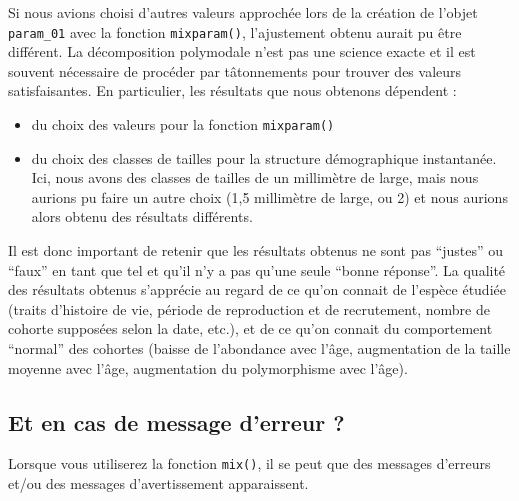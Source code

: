 \documentclass[
  a4paper,
  DIV=11,
  numbers=noendperiod,
  oneside]{scrreprt}
\providecommand{\tightlist}{%
  \setlength{\itemsep}{0pt}\setlength{\parskip}{0pt}}\usepackage{longtable,booktabs,array}
\begin{document}
\begin{tcolorbox}[enhanced jigsaw, colbacktitle=quarto-callout-important-color!10!white, opacityback=0, titlerule=0mm, leftrule=.75mm, bottomtitle=1mm, colframe=quarto-callout-important-color-frame, title=\textcolor{quarto-callout-important-color}{\faExclamation}\hspace{0.5em}{De l'importance du choix des valeurs initiales}, bottomrule=.15mm, opacitybacktitle=0.6, colback=white, rightrule=.15mm, breakable, toptitle=1mm, arc=.35mm, toprule=.15mm, left=2mm, coltitle=black]
Si nous avions choisi d'autres valeurs approchée lors de la création de
l'objet \texttt{param\_01} avec la fonction \texttt{mixparam()},
l'ajustement obtenu aurait pu être différent. La décomposition
polymodale n'est pas une science exacte et il est souvent nécessaire de
procéder par tâtonnements pour trouver des valeurs satisfaisantes. En
particulier, les résultats que nous obtenons dépendent :

\begin{itemize}
\tightlist
\item
  du choix des valeurs pour la fonction \texttt{mixparam()}
\item
  du choix des classes de tailles pour la structure démographique
  instantanée. Ici, nous avons des classes de tailles de un millimètre
  de large, mais nous aurions pu faire un autre choix (1,5 millimètre de
  large, ou 2) et nous aurions alors obtenu des résultats différents.
\end{itemize}

Il est donc important de retenir que les résultats obtenus ne sont pas
``justes'' ou ``faux'' en tant que tel et qu'il n'y a pas qu'une seule
``bonne réponse''. La qualité des résultats obtenus s'apprécie au regard
de ce qu'on connait de l'espèce étudiée (traits d'histoire de vie,
période de reproduction et de recrutement, nombre de cohorte supposées
selon la date, etc.), et de ce qu'on connait du comportement ``normal''
des cohortes (baisse de l'abondance avec l'âge, augmentation de la
taille moyenne avec l'âge, augmentation du polymorphisme avec l'âge).
\end{tcolorbox}

\hypertarget{et-en-cas-de-message-derreur}{%
\subsection{Et en cas de message d'erreur
?}\label{et-en-cas-de-message-derreur}}

Lorsque vous utiliserez la fonction \texttt{mix()}, il se peut que des
messages d'erreurs et/ou des messages d'avertissement apparaissent.
\end{document}
